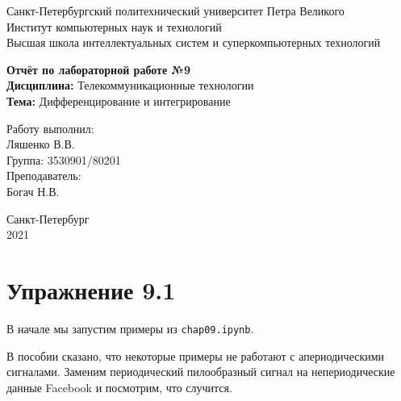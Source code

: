 \documentclass[a4paper,12pt]{report}
\begin{document}
 

\begin{titlepage}
\newpage
	\begin{center}
		\large Санкт-Петербургский политехнический университет Петра Великого\\
		Институт компьютерных наук и технологий\\
		Высшая школа интеллектуальных систем и суперкомпьютерных технологий\\
	\end{center}
\vspace{7cm}

\begin{center}
		\large \textbf{Отчёт по лабораторной работе №9} \\
		\textbf{Дисциплина:} Телекоммуникационные технологии\\
		\textbf{Тема:} Дифференцирование и интегрирование
\end{center}
\vspace{4cm}
	
\begin{flushright}
		\large Работу выполнил:\\ Ляшенко В.В.\\
		Группа: 3530901/80201\\
		Преподаватель:\\ Богач Н.В.
\end{flushright}

\vspace{\fill}
\begin{center}
	\large Санкт-Петербург\\ 2021
	\end{center}
\end{titlepage}

\tableofcontents
\listoffigures
\lstlistoflistings

\chapter{Упражнение 9.1}
    В начале мы запустим примеры из \texttt{chap09.ipynb}.
    
    В пособии сказано, что некоторые примеры не работают с апериодическими сигналами. Заменим периодический пилообразный сигнал на непериодические данные Facebook и посмотрим, что случится.
    
\end{document}
